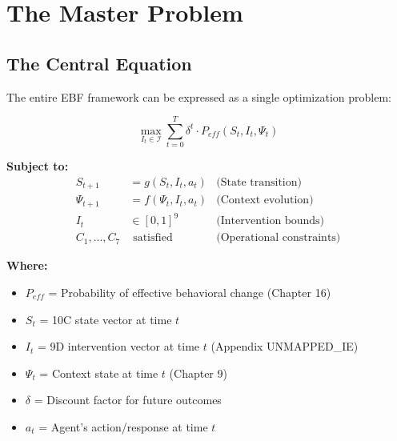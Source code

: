 \section{The Master Problem}
\label{sec:25-master-problem}

\subsection{The Central Equation}
\label{sec:25-central-equation}

The entire EBF framework can be expressed as a single optimization problem:

\begin{tcolorbox}[colback=blue!5!white,colframe=blue!75!black,
    title=\textbf{The EBF Master Problem (UNMAPPED_MP-1)}]
\begin{equation}
\max_{I_t \in \mathcal{I}} \sum_{t=0}^{T} \delta^t \cdot P_{eff}(S_t, I_t, \Psi_t)
\label{eq:master-problem}
\end{equation}

\textbf{Subject to:}
\begin{align}
    S_{t+1} &= g(S_t, I_t, a_t) & \text{(State transition)} \\
    \Psi_{t+1} &= f(\Psi_t, I_t, a_t) & \text{(Context evolution)} \\
    I_t &\in [0,1]^9 & \text{(Intervention bounds)} \\
    C_1, \ldots, C_7 &\text{ satisfied} & \text{(Operational constraints)}
\end{align}
\end{tcolorbox}

\textbf{Where:}
\begin{itemize}
    \item $P_{eff}$ = Probability of effective behavioral change (Chapter 16)
    \item $S_t$ = 10C state vector at time $t$
    \item $I_t$ = 9D intervention vector at time $t$ (Appendix UNMAPPED_IE)
    \item $\Psi_t$ = Context state at time $t$ (Chapter 9)
    \item $\delta$ = Discount factor for future outcomes
    \item $a_t$ = Agent's action/response at time $t$
\end{itemize}

